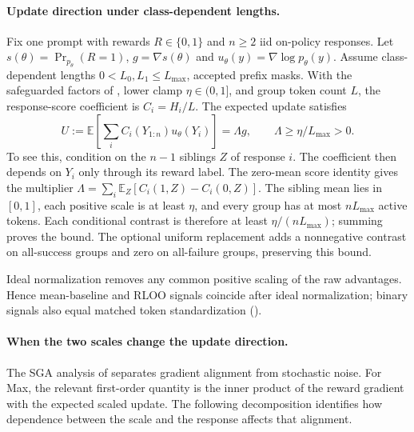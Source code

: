 \paragraph{Update direction under class-dependent lengths.}
Fix one prompt with rewards $R\in\{0,1\}$ and $n\ge2$ iid on-policy
responses. Let $s(\theta)=\Pr_{p_\theta}(R=1)$,
$g=\nabla s(\theta)$ and $u_\theta(y)=\nabla\log p_\theta(y)$.
Assume class-dependent lengths $0<L_0,L_1\le L_{\max}$, accepted prefix
masks. With the safeguarded factors of
, lower clamp $\eta\in(0,1]$, and group
token count $L$, the response-score coefficient is $C_i=H_i/L$.
The expected update satisfies
\[
 U:=\mathbb E\!\left[\sum_i C_i(Y_{1:n})u_\theta(Y_i)\right]
   =\Lambda g,\qquad \Lambda\ge\eta/L_{\max}>0.
\]
To see this, condition on the $n-1$ siblings $Z$ of response $i$.
The coefficient then depends on $Y_i$ only through its reward label.
The zero-mean score identity gives the multiplier
$\Lambda=\sum_i\mathbb E_Z[C_i(1,Z)-C_i(0,Z)]$.
The sibling mean lies in $[0,1]$, each positive scale is at least $\eta$,
and every group has at most $nL_{\max}$ active tokens. Each conditional
contrast is therefore at least $\eta/(nL_{\max})$; summing proves the bound.
The optional uniform replacement adds a nonnegative contrast on
all-success groups and zero on all-failure groups, preserving this bound.

Ideal normalization removes any common positive scaling of the raw
advantages. Hence mean-baseline and RLOO signals coincide after ideal
normalization; binary signals also equal matched token standardization
().

\paragraph{When the two scales change the update direction.}
The SGA analysis of \citet[Section~2]{li2025sga} separates gradient
alignment from stochastic noise. For Max, the relevant first-order
quantity is the inner product of the reward gradient with the expected
scaled update. The following decomposition identifies how dependence
between the scale and the response affects that alignment.

